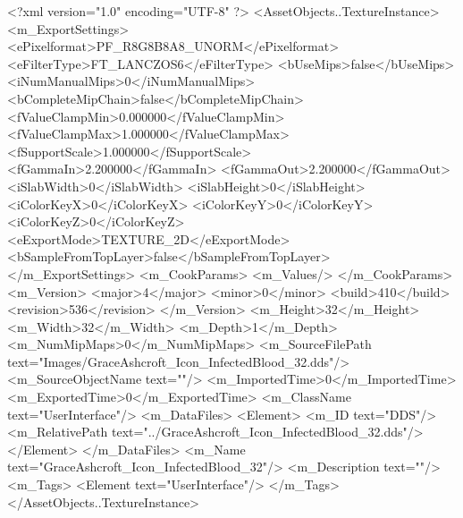 <?xml version="1.0" encoding="UTF-8" ?>
<AssetObjects..TextureInstance>
	<m_ExportSettings>
		<ePixelformat>PF_R8G8B8A8_UNORM</ePixelformat>
		<eFilterType>FT_LANCZOS6</eFilterType>
		<bUseMips>false</bUseMips>
		<iNumManualMips>0</iNumManualMips>
		<bCompleteMipChain>false</bCompleteMipChain>
		<fValueClampMin>0.000000</fValueClampMin>
		<fValueClampMax>1.000000</fValueClampMax>
		<fSupportScale>1.000000</fSupportScale>
		<fGammaIn>2.200000</fGammaIn>
		<fGammaOut>2.200000</fGammaOut>
		<iSlabWidth>0</iSlabWidth>
		<iSlabHeight>0</iSlabHeight>
		<iColorKeyX>0</iColorKeyX>
		<iColorKeyY>0</iColorKeyY>
		<iColorKeyZ>0</iColorKeyZ>
		<eExportMode>TEXTURE_2D</eExportMode>
		<bSampleFromTopLayer>false</bSampleFromTopLayer>
	</m_ExportSettings>
	<m_CookParams>
		<m_Values/>
	</m_CookParams>
	<m_Version>
		<major>4</major>
		<minor>0</minor>
		<build>410</build>
		<revision>536</revision>
	</m_Version>
	<m_Height>32</m_Height>
	<m_Width>32</m_Width>
	<m_Depth>1</m_Depth>
	<m_NumMipMaps>0</m_NumMipMaps>
	<m_SourceFilePath text="Images/GraceAshcroft_Icon_InfectedBlood_32.dds"/>
	<m_SourceObjectName text=""/>
	<m_ImportedTime>0</m_ImportedTime>
	<m_ExportedTime>0</m_ExportedTime>
	<m_ClassName text="UserInterface"/>
	<m_DataFiles>
		<Element>
			<m_ID text="DDS"/>
			<m_RelativePath text="../GraceAshcroft_Icon_InfectedBlood_32.dds"/>
		</Element>
	</m_DataFiles>
	<m_Name text="GraceAshcroft_Icon_InfectedBlood_32"/>
	<m_Description text=""/>
	<m_Tags>
		<Element text="UserInterface"/>
	</m_Tags>
</AssetObjects..TextureInstance>
